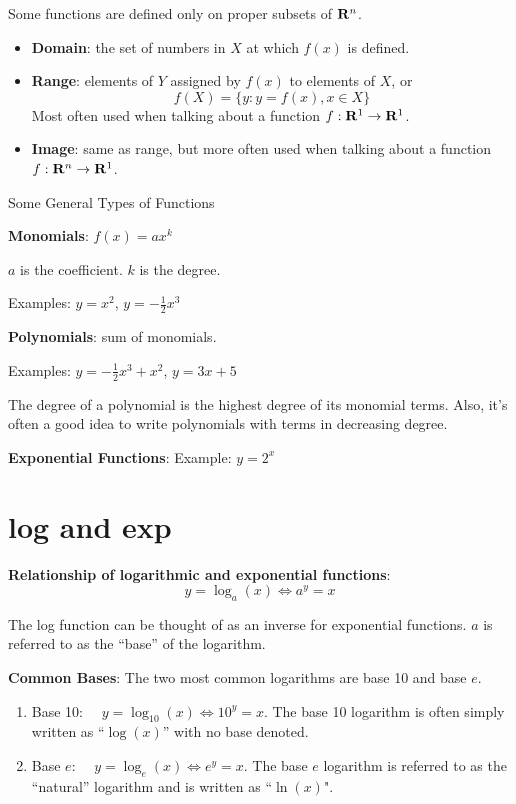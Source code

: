 \documentclass[
]{book}
\providecommand{\tightlist}{%
  \setlength{\itemsep}{0pt}\setlength{\parskip}{0pt}}
\theoremstyle{definition}
\theoremstyle{definition}
\theoremstyle{definition}
\theoremstyle{definition}
\theoremstyle{remark}
\begin{document}
Some functions are defined only on proper subsets of \({\bf R}^n\).

\begin{itemize}
\tightlist
\item
  \textbf{Domain}: the set of numbers in \(X\) at which \(f(x)\) is defined.
\item
  \textbf{Range}: elements of \(Y\) assigned by \(f(x)\) to elements of \(X\), or \[f(X)=\{ y : y=f(x), x\in X\}\]
  Most often used when talking about a function \(f:{\bf R}^1\to{\bf R}^1\).
\item
  \textbf{Image}: same as range, but more often used when talking about a function \(f:{\bf R}^n\to{\bf R}^1\).
\end{itemize}

Some General Types of Functions

\textbf{Monomials}: \(f(x)=a x^k\)

\(a\) is the coefficient. \(k\) is the degree.

Examples: \(y=x^2\), \(y=-\frac{1}{2}x^3\)

\textbf{Polynomials}: sum of monomials.

Examples: \(y=-\frac{1}{2}x^3+x^2\), \(y=3x+5\)

The degree of a polynomial is the highest degree of its monomial terms. Also, it's often a good idea to write polynomials with terms in decreasing degree.

\textbf{Exponential Functions}: Example: \(y=2^x\)

\hypertarget{logexponents}{%
\section{log and exp}\label{logexponents}}

\textbf{Relationship of logarithmic and exponential functions}:
\[y=\log_a(x) \iff a^y=x\]

The log function can be thought of as an inverse for exponential functions. \(a\) is referred to as the ``base'' of the logarithm.

\textbf{Common Bases}: The two most common logarithms are base 10 and base \(e\).

\begin{enumerate}
\def\labelenumi{\arabic{enumi}.}
\tightlist
\item
  Base 10: \(\quad y=\log_{10}(x) \iff 10^y=x\). The base 10 logarithm is often simply written as ``\(\log(x)\)'' with no base denoted.
\item
  Base \(e\): \(\quad y=\log_e(x) \iff e^y=x\). The base \(e\) logarithm is referred to as the ``natural'' logarithm and is written as ``\(\ln(x)\)".
\end{enumerate}
\end{document}
